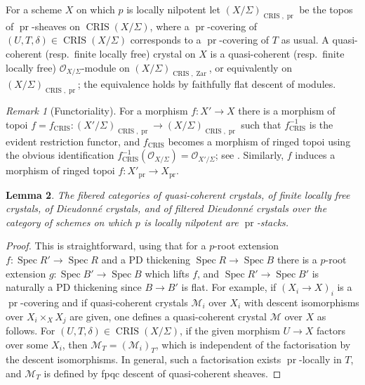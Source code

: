 \documentclass[a4paper,11pt]{article}
\theoremstyle{plain}
\newtheorem{Lemma}{Lemma}
\theoremstyle{definition}
\theoremstyle{remark}
\newtheorem{Remark}[Lemma]{Remark}
\theoremstyle{definition}
\numberwithin{Lemma}{section}
\numberwithin{Subpoint}{Lemma}
\numberwithin{equation}{section}
\newcommand{\MMM}{\mathcal{M}}
\newcommand{\OOO}{\mathcal{O}}
\DeclareMathOperator{\CRIS}{CRIS}
\DeclareMathOperator{\Spec}{Spec}
\DeclareMathOperator{\Zar}{Zar}
\newcommand{\nameoftop}{{\operatorname{pr}}}
\newcommand{\chang}[1]{{#1}}
\begin{document}
For a scheme $X$ on which $p$ is locally nilpotent
let $(X/\Sigma)_{\CRIS,\nameoftop}$ be the topos of $\nameoftop$-sheaves
on $\CRIS(X/\Sigma)$, where 
a $\nameoftop$-covering of $(U,T,\delta)\in\CRIS(X/\Sigma)$ 
corresponds to a $\nameoftop$-covering of $T$ as usual.
A quasi-coherent (resp.\ finite locally free) crystal on $X$ 
is a quasi-coherent (resp.\ finite locally free)
$\OOO_{X/\Sigma}$-module on $(X/\Sigma)_{\CRIS,\Zar}$, 
or equivalently on $(X/\Sigma)_{\CRIS,\nameoftop}$;
the equivalence holds by faithfully flat descent of modules.

\begin{Remark} [Functoriality]
\label{Rk:X/S-pr-funct} 
For a morphism $f:X'\to X$ 
there is a morphism of topoi
$f=f_{\CRIS}:(X'/\Sigma)_{\CRIS,\nameoftop}\to(X/\Sigma)_{\CRIS,\nameoftop}$
such that $f_{\CRIS}^{-1}$ is the evident restriction functor,
and $f_{\CRIS}$ becomes a morphism of ringed topoi using the \chang{obvious} identification 
$f_{\CRIS}^{-1}(\OOO_{X/\Sigma})=\OOO_{X'/\Sigma}$;
see \cite[1.1.10]{BBM}.
Similarly, $f$ induces a morphism of ringed topoi 
$f:X'_\nameoftop\to X_\nameoftop$.
\end{Remark}

\begin{Lemma}
\label{Le:descent-crystals}
The fibered categories of quasi-coherent crystals,
of finite locally free crystals,
of Dieudonn\'e crystals, and of filtered Dieudonn\'e crystals 
over the category of schemes on which $p$ is locally nilpotent 
are $\nameoftop$-stacks.
\end{Lemma}

\begin{proof}
This is straightforward, using that for a $p$-root extension
$f:\Spec R'\to\Spec R$ and a PD thickening $\Spec R\to\Spec B$  
there is a $p$-root extension $g:\Spec B'\to\Spec B$ which lifts $f$,
and $\Spec R'\to \Spec B'$ is naturally a PD thickening since $B\to B'$ is flat. 
\chang{For example, if $(X_i\to X)_i$ is a $\nameoftop$-covering and if quasi-coherent crystals $\MMM_i$ over $X_i$ with descent isomorphisms over $X_i\times_XX_j$ are given, one defines a quasi-coherent crystal $\MMM$ over $X$ as follows. For $(U,T,\delta)\in\CRIS(X/\Sigma)$, if the given morphism $U\to X$ factors over some $X_i$, then $\MMM_{T}=(\MMM_i)_{T}$, which is independent of the factorisation by the descent isomorphisms. In general, such a factorisation exists $\nameoftop$-locally in $T$, and $\MMM_{T}$ is defined by fpqc descent of quasi-coherent sheaves.}
\end{proof}
\end{document}
